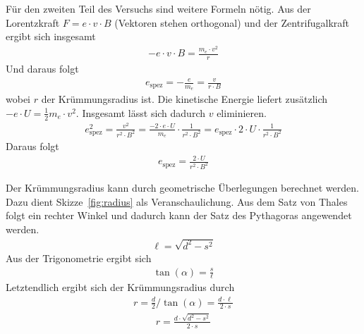 \documentclass{article}
\begin{document}
Für den zweiten Teil des Versuchs sind weitere Formeln nötig. Aus der Lorentzkraft $F=e\cdot v \cdot B$ (Vektoren stehen orthogonal) und der Zentrifugalkraft ergibt sich insgesamt
\begin{align*}
-e\cdot v \cdot B = \frac{m_e\cdot v^2}{r}
\end{align*}
Und daraus folgt
\begin{align*}
e_\text{spez} = -\frac{e}{m_e} = \frac{v}{r\cdot B}
\end{align*}
wobei $r$ der Krümmungsradius ist. Die kinetische Energie liefert zusätzlich $-e\cdot U = \frac{1}{2}m_e\cdot v^2$. Insgesamt lässt sich dadurch $v$ eliminieren.
\begin{align*}
e_\text{spez}^2 = \frac{v^2}{r^2\cdot B^2} =  \frac{-2\cdot e\cdot U}{m_e} \cdot \frac{1}{r^2\cdot B^2} = e_\text{spez}\cdot 2\cdot U \cdot \frac{1}{r^2\cdot B^2}
\end{align*}
Daraus folgt
\begin{align}
e_\text{spez} = \frac{2\cdot U}{r^2\cdot B^2}
\label{eq:espez}
\end{align}

Der Krümmungsradius kann durch geometrische Überlegungen berechnet werden. Dazu dient Skizze~\ref{fig:radius} als Veranschaulichung. Aus dem Satz von Thales folgt ein rechter Winkel und dadurch kann der Satz des Pythagoras angewendet werden.
\begin{align*}
\ell = \sqrt{d^2-s^2}
\end{align*}
Aus der Trigonometrie ergibt sich
\begin{align*}
\tan(\alpha) = \frac{s}{\ell}
\end{align*}
Letztendlich ergibt sich der Krümmungsradius durch
\begin{align*}
r = \frac{d}{2} \big / \tan(\alpha) = \frac{d\cdot \ell}{2\cdot s}
\end{align*}
\begin{align}
r = \frac{d\cdot \sqrt{d^2-s^2}}{2\cdot s}
\label{eq:radius}
\end{align}
\end{document}
